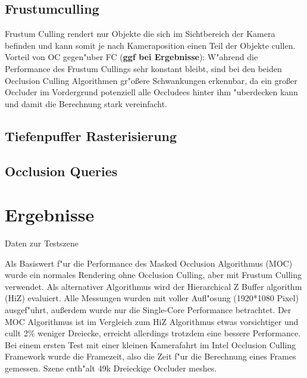 \documentclass[journal]{vgtc}
\begin{document}
\subsection{Frustumculling}
Frustum Culling rendert nur Objekte die sich im Sichtbereich der Kamera befinden und kann somit je nach Kameraposition einen Teil der Objekte cullen.\\
Vorteil von OC gegen"uber FC (\textbf{ggf bei Ergebnisse}): W"ahrend die Performance des Frustum Cullings sehr konstant bleibt, sind bei den beiden Occlusion Culling Algorithmen gr"o\ss{}ere Schwankungen erkennbar, da ein gro\ss{}er Occluder im Vordergrund potenziell alle Occludees hinter ihm "uberdecken kann und damit die Berechnung stark vereinfacht.\\
\subsection{Tiefenpuffer Rasterisierung}
\subsection{Occlusion Queries}

\section{Ergebnisse}
Daten zur Testszene

Als Basiswert f"ur die Performance des Masked Occlusion Algorithmus (MOC) wurde ein normales Rendering ohne Occlusion Culling, aber mit Frustum Culling verwendet.
Als alternativer Algorithmus wird der \glqq Hierarchical Z Buffer algorithm \grqq{} (HiZ) evaluiert.
Alle Messungen wurden mit voller Aufl"osung (1920*1080 Pixel) ausgef"uhrt, au\ss{}erdem wurde nur die Single-Core Performance betrachtet.
Der MOC Algorithmus ist im Vergleich zum HiZ Algorithmus etwas vorsichtiger und cullt 2\% weniger Dreiecke, erreicht allerdings trotzdem eine bessere Performance.
Bei einem ersten Test mit einer kleinen Kamerafahrt im Intel Occlusion Culling Framework wurde die Framezeit, also die Zeit f"ur die Berechnung eines Frames gemessen.
Szene enth"alt 49k Dreieckige Occluder meshes.
\end{document}
